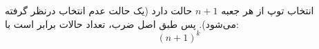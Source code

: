 \p
انتخاب توپ از هر جعبه $n+1$ حالت دارد 
(یک حالت عدم انتخاب درنظر گرفته می‌شود).
پس طبق اصل ضرب، تعداد حالات برابر است با:
$$(n+1)^k$$   